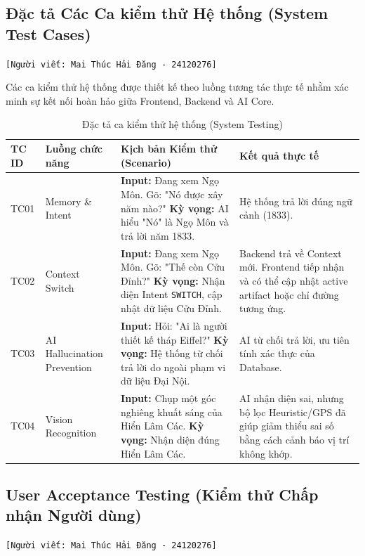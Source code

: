 \subsection{Đặc tả Các Ca kiểm thử Hệ thống (System Test Cases)}
\texttt{[Người viết: Mai Thúc Hải Đăng - 24120276]}


Các ca kiểm thử hệ thống được thiết kế theo luồng tương tác thực tế nhằm xác minh sự kết nối hoàn hảo giữa Frontend, Backend và AI Core.

\begin{table}[H]
    \centering
    \renewcommand{\arraystretch}{1.4}
    \begin{tabular}{|p{1cm}|p{3.5cm}|p{5.5cm}|p{3.8cm}|}
        \hline
        \textbf{TC ID} & \textbf{Luồng chức năng} & \textbf{Kịch bản Kiểm thử (Scenario)} & \textbf{Kết quả thực tế} \\ \hline
        TC01 & Memory \& Intent & \textbf{Input:} Đang xem Ngọ Môn. Gõ: "Nó được xây năm nào?" \newline \textbf{Kỳ vọng:} AI hiểu "Nó" là Ngọ Môn và trả lời năm 1833. & Hệ thống trả lời đúng ngữ cảnh (1833). \\ \hline
        TC02 & Context Switch & \textbf{Input:} Đang xem Ngọ Môn. Gõ: "Thế còn Cửu Đỉnh?" \newline \textbf{Kỳ vọng:} Nhận diện Intent \texttt{SWITCH}, cập nhật dữ liệu Cửu Đỉnh. & Backend trả về Context mới. Frontend tiếp nhận và có thể cập nhật active artifact hoặc chỉ đường tương ứng. \\ \hline
        TC03 & AI Hallucination Prevention & \textbf{Input:} Hỏi: "Ai là người thiết kế tháp Eiffel?" \newline \textbf{Kỳ vọng:} Hệ thống từ chối trả lời do ngoài phạm vi dữ liệu Đại Nội. & AI từ chối trả lời, ưu tiên tính xác thực của Database. \\ \hline
        TC04 & Vision Recognition & \textbf{Input:} Chụp một góc nghiêng khuất sáng của Hiển Lâm Các. \newline \textbf{Kỳ vọng:} Nhận diện đúng Hiển Lâm Các. & AI nhận diện sai, nhưng bộ lọc Heuristic/GPS đã giúp giảm thiểu sai số bằng cách cảnh báo vị trí không khớp. \\ \hline
    \end{tabular}
    \caption{Đặc tả ca kiểm thử hệ thống (System Testing)}
\end{table}

\subsection{User Acceptance Testing (Kiểm thử Chấp nhận Người dùng)}
\texttt{[Người viết: Mai Thúc Hải Đăng - 24120276]}


